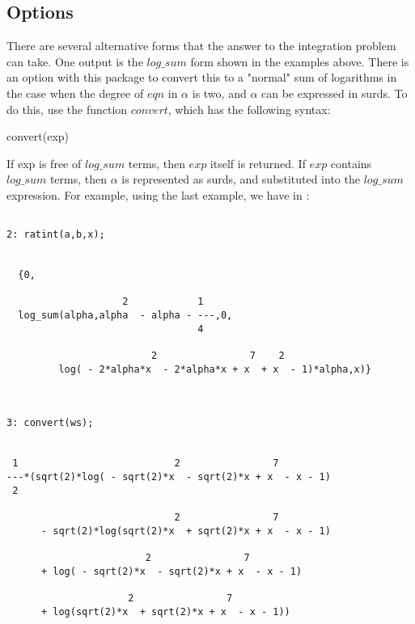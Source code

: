\subsection{Options}
There are several alternative forms that the answer to the integration problem can take. One output is the $log\_sum$ form shown in the examples above. There is an option with this package to convert this to a "normal" sum of logarithms in the case when the degree of $eqn$ in $\alpha$ is two, and $\alpha$ can be expressed in surds. To do this, use the function $convert$, which has the following syntax:
\begin{center}  convert(exp) \end{center}
If exp is free of $log\_sum$ terms, then $exp$ itself is returned. If $exp$ contains $log\_sum$ terms, then $\alpha$ is represented as surds, and substituted into the $log\_sum$ expression. For example, using the last example, we have in \REDUCE:
\begin{verbatim}

2: ratint(a,b,x); 


  {0,

                    2            1
  log_sum(alpha,alpha  - alpha - ---,0,
                                 4

                         2                7    2
         log( - 2*alpha*x  - 2*alpha*x + x  + x  - 1)*alpha,x)} 



3: convert(ws);


 1                           2                7
---*(sqrt(2)*log( - sqrt(2)*x  - sqrt(2)*x + x  - x - 1)
 2

                             2                7
      - sqrt(2)*log(sqrt(2)*x  + sqrt(2)*x + x  - x - 1)

                        2                7
      + log( - sqrt(2)*x  - sqrt(2)*x + x  - x - 1)

                     2                7
      + log(sqrt(2)*x  + sqrt(2)*x + x  - x - 1))

\end{verbatim}
